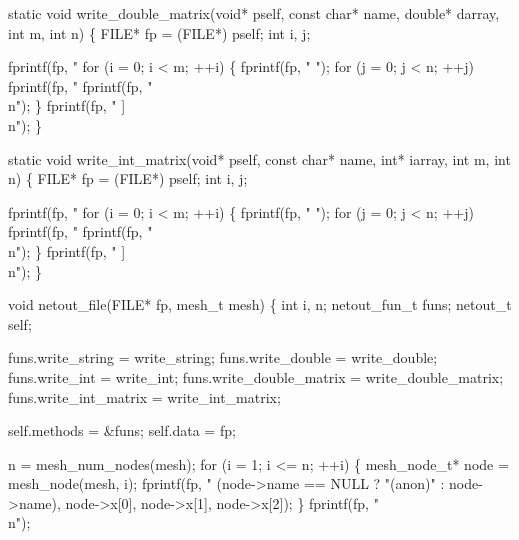 \nwendcode{}\nwdocspar

\nwenddocs{}\plusendmoddef
static void write_double_matrix(void* pself, const char* name,
                                double* darray, int m, int n)
\{
    FILE* fp = (FILE*) pself;
    int i, j;

    fprintf(fp, "  %
    for (i = 0; i < m; ++i) \{
        fprintf(fp, "    ");
        for (j = 0; j < n; ++j)
            fprintf(fp, "%
        fprintf(fp, "\\n");
    \}
    fprintf(fp, "  ]\\n");
\}

static void write_int_matrix(void* pself, const char* name,
                             int* iarray, int m, int n)
\{
    FILE* fp = (FILE*) pself;
    int i, j;

    fprintf(fp, "  %
    for (i = 0; i < m; ++i) \{
        fprintf(fp, "    ");
        for (j = 0; j < n; ++j)
            fprintf(fp, "%
        fprintf(fp, "\\n");
    \}
    fprintf(fp, "  ]\\n");
\}

\nwendcode{}\nwdocspar

\nwenddocs{}\endmoddef
void netout_file(FILE* fp, mesh_t mesh)
\{
    int i, n;
    netout_fun_t funs;
    netout_t     self;

    funs.write_string = write_string;
    funs.write_double = write_double;
    funs.write_int    = write_int;
    funs.write_double_matrix = write_double_matrix;
    funs.write_int_matrix    = write_int_matrix;

    self.methods = &funs;
    self.data    = fp;

    n = mesh_num_nodes(mesh);
    for (i = 1; i <= n; ++i) \{
        mesh_node_t* node = mesh_node(mesh, i);
        fprintf(fp, "%
                (node->name == NULL ? "(anon)" : node->name),
                node->x[0], node->x[1], node->x[2]);
    \}
    fprintf(fp, "\\n");

